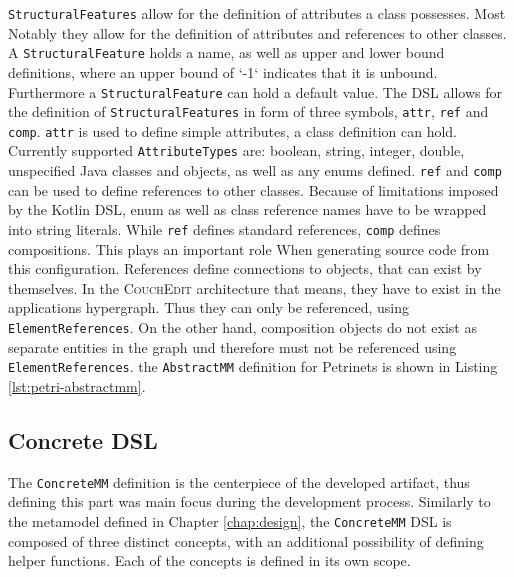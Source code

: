 
% 


% 

\texttt{StructuralFeatures} allow for the definition of attributes a class possesses. Most Notably they allow for the definition of attributes and references to other classes. A \texttt{StructuralFeature} holds a name, as well as upper and lower bound definitions, where an upper bound of `-1` indicates that it is unbound. Furthermore a \texttt{StructuralFeature} can hold a default value. The DSL allows for the definition of \texttt{StructuralFeatures} in form of three symbols, \texttt{attr}, \texttt{ref} and \texttt{comp}. \texttt{attr} is used to define simple attributes, a class definition can hold. Currently supported \texttt{AttributeTypes} are: boolean, string, integer, double, unspecified Java classes and objects, as well as any enums defined. \texttt{ref} and \texttt{comp} can be used to define references to other classes. Because of limitations imposed by the Kotlin DSL, enum as well as class reference names have to be wrapped into string literals. While \texttt{ref} defines standard references, \texttt{comp} defines compositions. This plays an important role When generating source code from this configuration. References define connections to objects, that can exist by themselves. In the \textsc{CouchEdit} architecture that means, they have to exist in the applications hypergraph. Thus they can only be referenced, using \texttt{ElementReferences}. On the other hand, composition objects do not exist as separate entities in the graph und therefore must not be referenced using \texttt{ElementReferences}. the \texttt{AbstractMM} definition for Petrinets is shown in Listing \ref{lst:petri-abstractmm}.

\subsection{Concrete DSL}
The \texttt{ConcreteMM} definition is the centerpiece of the developed artifact, thus defining this part was main focus during the development process. Similarly to the metamodel defined in Chapter \ref{chap:design}, the \texttt{ConcreteMM} DSL is composed of three distinct concepts, with an additional possibility of defining helper functions. Each of the concepts is defined in its own scope.



